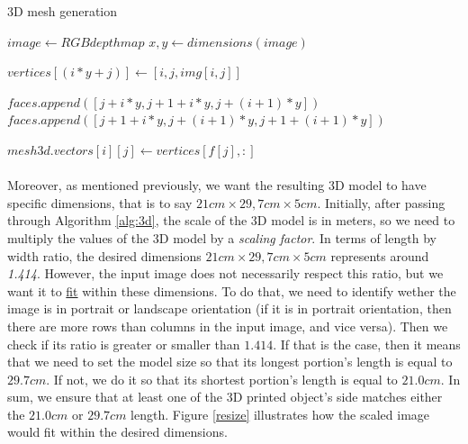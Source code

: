 \documentclass[12pt, letterpaper]{article}
\begin{document}
\begin{spacing}{1.15}
\begin{algorithm}
    \caption{3D mesh generation} \label{alg:3d}
    \begin{algorithmic}
        \State $image \gets RGB depth map$
        \State $x,y \gets dimensions(image)$

            \State $vertices[(i*y+j)] \gets [i, j, img[i, j]]$
        \EndFor
        \EndFor

            \State $faces.append([j + i*y, j+1 + i*y, j+(i+1)*y])$
            \State $faces.append([j+1 + i*y, j + (i+1)*y, j+1 +(i+1)*y])$
        \EndFor
        \EndFor
        
                \State $mesh3d.vectors[i][j] \gets vertices[f[j], :]$ 
            \EndFor
        \EndFor

    \end{algorithmic}
\end{algorithm}

\paragraph{} Moreover, as mentioned previously, we want the resulting 3D model to have specific dimensions, that is to say $21cm\times29,7cm\times5cm$. Initially, after passing through Algorithm
\ref{alg:3d}, the scale of the 3D model is in meters, so we need to multiply the values of the 3D model by a \emph{scaling factor}.
In terms of length by width ratio, the desired dimensions $21cm\times29,7cm\times5cm$ represents around \emph{1.414}. However, the input image does not necessarily respect this ratio, but
we want it to \underline{fit} within these dimensions. To do that, we need to identify wether the image is in portrait or landscape orientation (if it is in portrait orientation, then
there are more rows than columns in the input image, and vice versa). Then we check if its ratio is greater or smaller than $1.414$. If that is the case, then it means that we need to set the model size
so that its longest portion's length is equal to \(29.7cm\). If not, we do it so that its shortest portion's length is equal to $21.0cm$. In sum, we ensure that at least one of the 3D printed
object's side matches either the $21.0cm$ or $29.7cm$ length. Figure \ref{resize} illustrates how the scaled image would fit within the desired dimensions.


\end{spacing}
\end{document}
